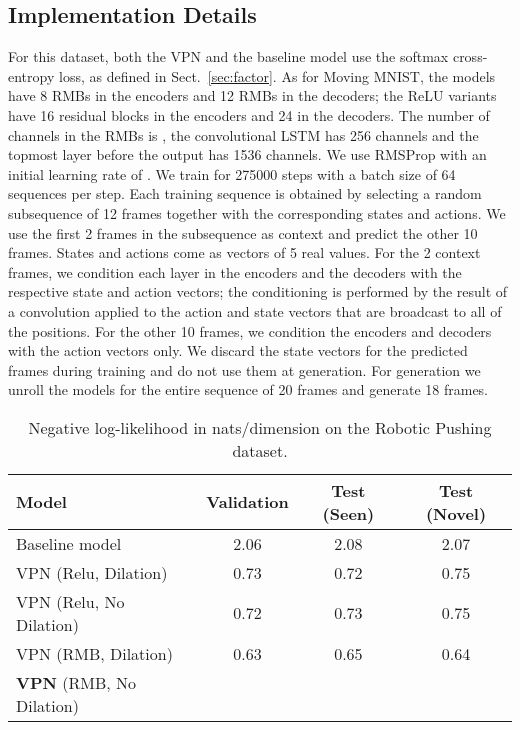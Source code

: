 \documentclass{article}
\begin{document}
\subsection{Implementation Details}

For this dataset, both the VPN and the baseline model use the softmax cross-entropy loss, as defined in Sect.~\ref{sec:factor}. As for Moving MNIST, the models have 8 RMBs in the encoders and 12 RMBs in the decoders; the ReLU variants have 16 residual blocks in the encoders and 24 in the decoders. The number of channels in the RMBs is , the convolutional LSTM has 256 channels and the topmost layer before the output has 1536 channels. We use RMSProp with an initial learning rate of . We train for 275000 steps with a batch size of 64 sequences per step. Each training sequence is obtained by selecting a random subsequence of 12 frames together with the corresponding states and actions. We use the first 2 frames in the subsequence as context and predict the other 10 frames. States and actions come as vectors of 5 real values. For the 2 context frames, we condition each layer in the encoders and the decoders with the respective state and action vectors; the conditioning is performed by the result of a  convolution applied to the action and state vectors that are broadcast to all of the  positions.  For the other 10 frames, we condition the encoders and decoders with the action vectors only. We discard the state vectors for the predicted frames during training and do not use them at generation. For generation we unroll the models for the entire sequence of 20 frames and generate 18 frames.

\begin{table}[t]
\small
  \begin{center}
  \small
  \begin{tabular}{lccc}
    \toprule
    \textbf{Model} &  \textbf{Validation} &  \textbf{Test (Seen)} &  \textbf{Test (Novel)} \\ \midrule
      {Baseline model} & 2.06 & 2.08 & 2.07 \\ 
      {VPN (Relu, Dilation)} &  0.73 & 0.72 & 0.75 \\ 
      {VPN (Relu, No Dilation)} &  0.72 & 0.73 & 0.75 \\ 
      {VPN (RMB, Dilation)} &  0.63 & 0.65 & 0.64 \\ 
      {\textbf{VPN} (RMB, No Dilation)} &   &  &   \\
      \bottomrule
  \end{tabular}
  \end{center}
\caption{Negative log-likelihood in nats/dimension on the Robotic Pushing dataset. }
\label{table:robot_act}
\end{table}
\end{document}
